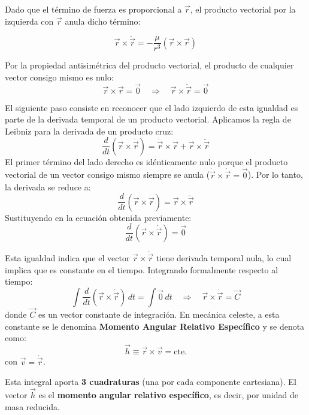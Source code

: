 Dado que el término de fuerza es proporcional a $\vec{r}$, el producto vectorial por la izquierda con $\vec{r}$ anula dicho término:

$$
\vec{r} \times \ddot{\vec{r}} = -\frac{\mu}{r^3}(\vec{r} \times \vec{r})
$$

Por la propiedad antisimétrica del producto vectorial, el producto de cualquier vector consigo mismo es nulo:
$$
\vec{r} \times \vec{r} = \vec{0} \quad \Rightarrow \quad \vec{r} \times \ddot{\vec{r}} = \vec{0}
$$

El siguiente paso consiste en reconocer que el lado izquierdo de esta igualdad es parte de la derivada temporal de un producto vectorial. Aplicamos la regla de Leibniz para la derivada de un producto cruz:
$$
\frac{d}{dt}(\vec{r} \times \dot{\vec{r}}) = \dot{\vec{r}} \times \dot{\vec{r}} + \vec{r} \times \ddot{\vec{r}}
$$
El primer término del lado derecho es idénticamente nulo porque el producto vectorial de un vector consigo mismo siempre se anula ($\dot{\vec{r}} \times \dot{\vec{r}} = \vec{0}$). Por lo tanto, la derivada se reduce a:
$$
\frac{d}{dt}(\vec{r} \times \dot{\vec{r}}) = \vec{r} \times \ddot{\vec{r}}
$$
Sustituyendo en la ecuación obtenida previamente:
$$
\frac{d}{dt}(\vec{r} \times \dot{\vec{r}}) = \vec{0}
$$

Esta igualdad indica que el vector $\vec{r} \times \dot{\vec{r}}$ tiene derivada temporal nula, lo cual implica que es constante en el tiempo. Integrando formalmente respecto al tiempo:
$$
\int \frac{d}{dt}(\vec{r} \times \dot{\vec{r}})\, dt = \int \vec{0}\, dt \quad \Rightarrow \quad \vec{r} \times \dot{\vec{r}} = \vec{C}
$$
donde $\vec{C}$ es un vector constante de integración. En mecánica celeste, a esta constante se le denomina \textbf{Momento Angular Relativo Específico} y se denota como:
$$
\boxed{\vec{h} \equiv \vec{r} \times \vec{v} = \text{cte.}}
$$
con $\vec{v} = \dot{\vec{r}}$.


Esta integral aporta \textbf{3 cuadraturas} (una por cada componente cartesiana). El vector \(\vec{h}\) es el \textbf{momento angular relativo específico}, es decir, por unidad de masa reducida.

